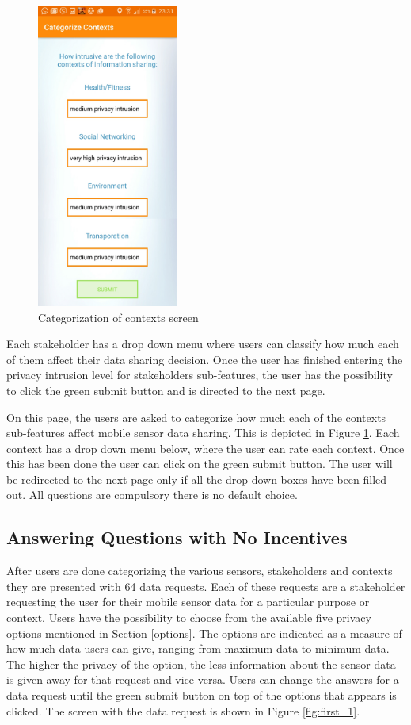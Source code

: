 \begin{figure}[ht!]
\centering
\includegraphics[width=0.4\linewidth, height=10cm]{./images/cat_contexts}
\caption{Categorization of contexts screen}
\label{fig:cat_co}
\end{figure}

Each stakeholder has a drop
down menu where users can classify how much each of them affect their data sharing decision.
Once the user has finished entering the privacy intrusion level for stakeholders sub-features, the user has the possibility to click the green submit button and is directed to the next page.


On this page, the users are asked to categorize how much each of the contexts sub-features affect mobile sensor data sharing. This is depicted in Figure \ref{fig:cat_co}. Each context has a drop down menu below, where the user can rate each context. Once this has been done the user can click on the green submit button. The user will be redirected to the next page only if all the drop down boxes have been filled out. All questions are compulsory there is no default choice.

\subsection{Answering Questions with No Incentives}  \label{quest_wi}
After users are done categorizing the various sensors, stakeholders and contexts they are presented with 64 data requests. Each of these requests are a stakeholder requesting the user for their mobile sensor data for a particular purpose or context. Users have the possibility to choose from the available five privacy options mentioned in Section \ref{options}. The options are indicated as a measure of how much data users can give, ranging from maximum data to minimum data. The higher the privacy of the option, the less information about the sensor data is given away for that request and vice versa. Users can change the answers for a data request until the green submit button on top of the options that appears is clicked. The screen with the data request is shown in Figure \ref{fig:first_1}. 

